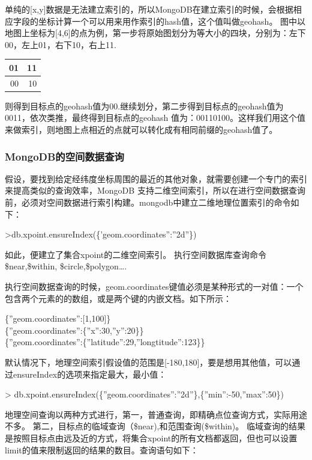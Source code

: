 \documentclass[master]{njnuthesis}
\begin{document}
单纯的[x,y]数据是无法建立索引的，所以MongoDB在建立索引的时候，会根据相应字段的坐标计算一个可以用来用作索引的hash值，这个值叫做geohash。
图中以地图上坐标为[4,6]的点为例，第一步将原始图划分为等大小的四块，分别为：左下00，左上01，右下10，右上11.

\begin{center}
\begin{tabular}{|r|r|}
\hline
 01  &  11  \\
\hline
 00  &  10  \\
 \hline
\end{tabular}
\label{table:1}
\end{center}

则得到目标点的geohash值为00.继续划分，第二步得到目标点的geohash值为0011，依次类推，最终得到目标点的geohash 值为：00110100。这样我们用这个值来做索引，则地图上点相近的点就可以转化成有相同前缀的geohash值了。

\subsubsection{MongoDB的空间数据查询}
假设，要找到给定经纬度坐标周围的最近的其他对象，就需要创建一个专门的索引来提高类似的查询效率，MongoDB 支持二维空间索引，所以在进行空间数据查询前，必须对空间数据进行索引构建。mongodb中建立二维地理位置索引的命令如下：

\noindent >db.xpoint.ensureIndex(\{'geom.coordinates'':''2d''\})

如此，便建立了集合xpoint的二维空间索引。
执行空间数据库查询命令\$near,\$within, \$circle,\$polygon\ldots{}.

执行空间数据查询的时候，geom.coordinates键值必须是某种形式的一对值：一个包含两个元素的的数组，或是两个键的内嵌文档。如下所示：

\noindent \{''geom.coordinates'':[1,100]\}\\
\{''geom.coordinates'':\{''x'':30,''y'':20\}\}\\
\{''geom.coordinates'':\{''latitude'':29,''longtitude'':123\}\}

默认情况下，地理空间索引假设值的范围是[-180,180]，要是想用其他值，可以通过ensureIndex的选项来指定最大，最小值：

\noindent > db.xpoint.ensureIndex(\{''geom.coordinates'':''2d''\},\{''min'':-50,''max'':50\})

地理空间查询以两种方式进行，第一，普通查询，即精确点位查询方式，实际用途不多。
第二，目标点的临域查询（\$near),和范围查询(\$within)。
临域查询的结果是按照目标点由远及近的方式，将集合xpoint的所有文档都返回，但也可以设置limit的值来限制返回的结果的数目。查询语句如下：
\end{document}
